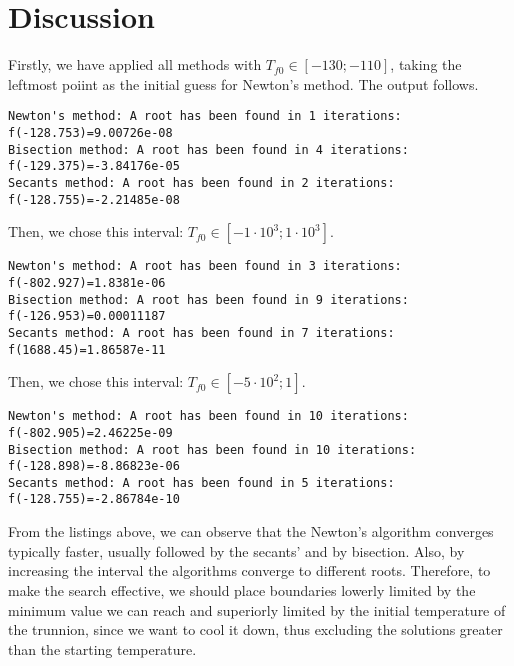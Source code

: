 \documentclass[a4paper,12pt]{article}
\begin{document}
\section{Discussion}
    \par Firstly, we have applied all methods with $T_{f0} \in [-130;-110]$, taking the leftmost poiint as the initial guess for Newton's method. The output follows.
    \begin{verbatim}
Newton's method: A root has been found in 1 iterations: f(-128.753)=9.00726e-08
Bisection method: A root has been found in 4 iterations: f(-129.375)=-3.84176e-05
Secants method: A root has been found in 2 iterations: f(-128.755)=-2.21485e-08
    \end{verbatim}
    \par Then, we chose this interval: $T_{f0} \in [-1\cdot 10^3;1\cdot 10^3]$.
    \begin{verbatim}
Newton's method: A root has been found in 3 iterations: f(-802.927)=1.8381e-06
Bisection method: A root has been found in 9 iterations: f(-126.953)=0.00011187
Secants method: A root has been found in 7 iterations: f(1688.45)=1.86587e-11
    \end{verbatim}
    \par Then, we chose this interval: $T_{f0} \in [-5\cdot 10^2;1]$.
    \begin{verbatim}
Newton's method: A root has been found in 10 iterations: f(-802.905)=2.46225e-09
Bisection method: A root has been found in 10 iterations: f(-128.898)=-8.86823e-06
Secants method: A root has been found in 5 iterations: f(-128.755)=-2.86784e-10
    \end{verbatim}
    \par From the listings above, we can observe that the Newton's algorithm converges typically faster, usually followed by the secants' and by bisection. Also, by increasing the interval the algorithms converge to different roots. Therefore, to make the search effective, we should place boundaries lowerly limited by the minimum value we can reach and superiorly limited by the initial temperature of the trunnion, since we want to cool it down, thus excluding the solutions greater than the starting temperature.
\end{document}
